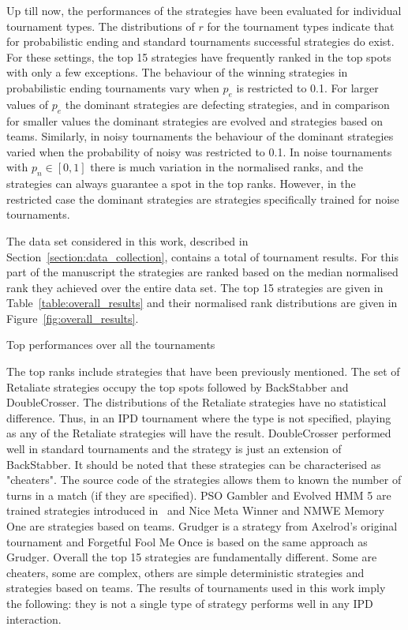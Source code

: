 \documentclass{article}
\newcommand{\numberofalltournaments}{}
\newcommand{\numberofstrategies}{}
\begin{document}
Up till now, the performances of the \numberofstrategies strategies have been evaluated for
individual tournament types. The distributions of \(r\) for the tournament types indicate that
for probabilistic ending and standard tournaments successful strategies do exist.
For these settings, the top 15 strategies have frequently ranked in
the top spots with only a few exceptions. The behaviour of the winning strategies
in probabilistic ending tournaments vary when \(p_e\) is restricted to 0.1.
For larger values of \(p_e\) the dominant strategies are defecting strategies,
and in comparison for smaller values the dominant strategies are evolved
and strategies based on teams. Similarly, in noisy tournaments the behaviour
of the dominant strategies varied when the probability of noisy was restricted
to 0.1. In noise tournaments with \(p_n \in [0, 1]\) there is much variation
in the normalised ranks, and the strategies can always guarantee a spot in the
top ranks. However, in the restricted case the dominant strategies are strategies
specifically trained for noise tournaments.

The data set considered in this work, described in
Section~\ref{section:data_collection}, contains a total of
\numberofalltournaments tournament results. For this part of the manuscript the
strategies are ranked based on the median normalised rank they achieved over the
entire data set. The top 15 strategies are given in
Table~\ref{table:overall_results} and their normalised rank distributions are
given in Figure~\ref{fig:overall_results}.

\begin{table}[!htbp]
    \centering
    \resizebox{.27\textwidth}{!}{
    }
    \caption{Top performances over all the tournaments}\label{table:overall_results}
\end{table}

The top ranks include strategies that have been previously mentioned. The
set of Retaliate strategies occupy the top spots followed by BackStabber
and DoubleCrosser. The distributions of the Retaliate strategies have no
statistical difference. Thus, in an IPD tournament where the type is not
specified, playing as any of the Retaliate strategies will have the result.
DoubleCrosser performed well in standard tournaments and the
strategy is just an extension of BackStabber. It should be noted that these
strategies can be characterised as "cheaters". The source code of the strategies
allows them to known the number of turns in a match (if they are specified).
PSO Gambler and Evolved HMM 5 are
trained strategies introduced in~\cite{Harper2017} and Nice Meta Winner and NMWE
Memory One are strategies based on teams. Grudger is a strategy from Axelrod's
original tournament and Forgetful Fool Me Once is based on the same approach as
Grudger. Overall the top 15 strategies are fundamentally different. Some are cheaters,
some are complex, others are simple deterministic strategies and strategies based
on teams. The results of \numberofalltournaments tournaments used in this work imply the following:
they is not a single type of strategy performs well in any IPD interaction.
\end{document}
